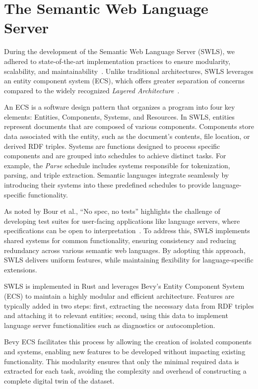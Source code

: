 \section{The Semantic Web Language Server}%
\label{sec:semantic_lsp}

During the development of the Semantic Web Language Server (SWLS), we adhered to state-of-the-art implementation practices to ensure modularity, scalability, and maintainability~\cite{10.1145/3550355.3552452,10.1145/3563834.3567537,10.1145/3550355.3552452,Bour_2018}.
Unlike traditional architectures, SWLS leverages an entity component system (ECS), which offers greater separation of concerns compared to the widely recognized \textit{Layered Architecture}~\cite{10.1145/3550355.3552452}.

An ECS is a software design pattern that organizes a program into four key elements: Entities, Components, Systems, and Resources. 
In SWLS, entities represent documents that are composed of various components. 
Components store data associated with the entity, such as the document's contents, file location, or derived RDF triples. 
Systems are functions designed to process specific components and are grouped into schedules to achieve distinct tasks. 
For example, the \textit{Parse} schedule includes systems responsible for tokenization, parsing, and triple extraction.
Semantic languages integrate seamlessly by introducing their systems into these predefined schedules to provide language-specific functionality.

As noted by Bour et al., “No spec, no tests” highlights the challenge of developing test suites for user-facing applications like language servers, where specifications can be open to interpretation~\cite{Bour_2018}. 
To address this, SWLS implements shared systems for common functionality, ensuring consistency and reducing redundancy across various semantic web languages.
By adopting this approach, SWLS delivers uniform features, while maintaining flexibility for language-specific extensions.

SWLS is implemented in Rust and leverages Bevy’s Entity Component System (ECS) to maintain a highly modular and efficient architecture.
Features are typically added in two steps:
  first, extracting the necessary data from RDF triples and attaching it to relevant entities; 
  second, using this data to implement language server functionalities such as diagnostics or autocompletion.

Bevy ECS facilitates this process by allowing the creation of isolated components and systems, enabling new features to be developed without impacting existing functionality.
This modularity ensures that only the minimal required data is extracted for each task, avoiding the complexity and overhead of constructing a complete digital twin of the dataset.

